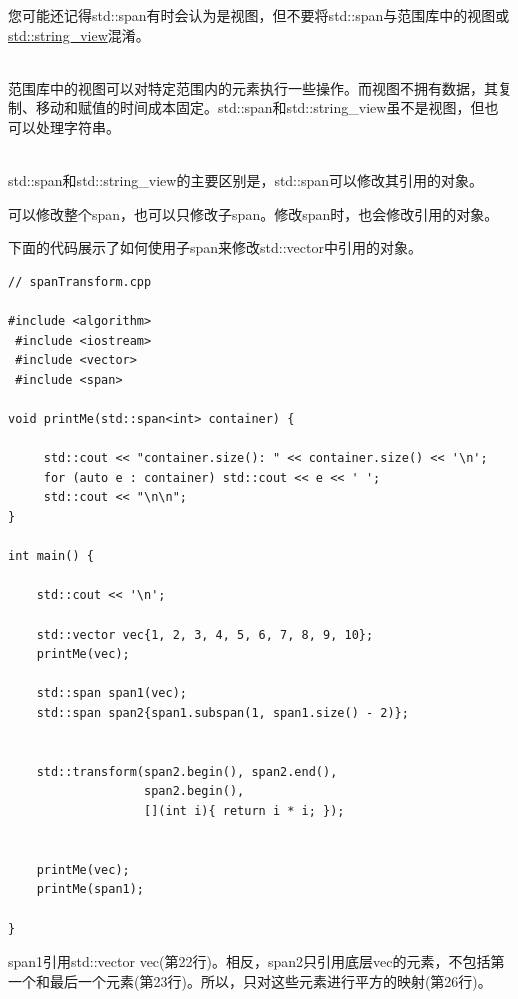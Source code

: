 \begin{tcolorbox}[breakable,enhanced jigsaw,colback=red!5!white,colframe=red!75!black,title={std::span既不是std::string\_view也不是视图}]
	
您可能还记得std::span有时会认为是视图，但不要将std::span与范围库中的视图或\href{https://www.modernescpp.com/index.php/c-17-what-s-new-in-the-library}{std::string\_view}混淆。

\hspace*{\fill} \\ %
范围库中的视图可以对特定范围内的元素执行一些操作。而视图不拥有数据，其复制、移动和赋值的时间成本固定。std::span和std::string\_view虽不是视图，但也可以处理字符串。

\hspace*{\fill} \\ %
std::span和std::string\_view的主要区别是，std::span可以修改其引用的对象。
\end{tcolorbox}
	

可以修改整个span，也可以只修改子span。修改span时，也会修改引用的对象。

下面的代码展示了如何使用子span来修改std::vector中引用的对象。

\begin{lstlisting}[style=styleCXX]
// spanTransform.cpp

#include <algorithm>
 #include <iostream>
 #include <vector>
 #include <span>

void printMe(std::span<int> container) {
	
	 std::cout << "container.size(): " << container.size() << '\n';
	 for (auto e : container) std::cout << e << ' ';
	 std::cout << "\n\n";
}

int main() {

	std::cout << '\n';
	
	std::vector vec{1, 2, 3, 4, 5, 6, 7, 8, 9, 10};
	printMe(vec);
	
	std::span span1(vec);
	std::span span2{span1.subspan(1, span1.size() - 2)};
	
	
	std::transform(span2.begin(), span2.end(),
	               span2.begin(),
	               [](int i){ return i * i; });
	
	
	printMe(vec);
	printMe(span1);

}
\end{lstlisting}

span1引用std::vector vec(第22行)。相反，span2只引用底层vec的元素，不包括第一个和最后一个元素(第23行)。所以，只对这些元素进行平方的映射(第26行)。

